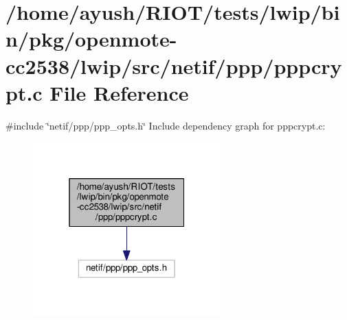 \hypertarget{openmote-cc2538_2lwip_2src_2netif_2ppp_2pppcrypt_8c}{}\section{/home/ayush/\+R\+I\+O\+T/tests/lwip/bin/pkg/openmote-\/cc2538/lwip/src/netif/ppp/pppcrypt.c File Reference}
\label{openmote-cc2538_2lwip_2src_2netif_2ppp_2pppcrypt_8c}
{\ttfamily \#include \char`\"{}netif/ppp/ppp\+\_\+opts.\+h\char`\"{}}\newline
Include dependency graph for pppcrypt.\+c\+:
\nopagebreak
\begin{figure}[H]
\begin{center}
\leavevmode
\includegraphics[width=205pt]{openmote-cc2538_2lwip_2src_2netif_2ppp_2pppcrypt_8c__incl}
\end{center}
\end{figure}
